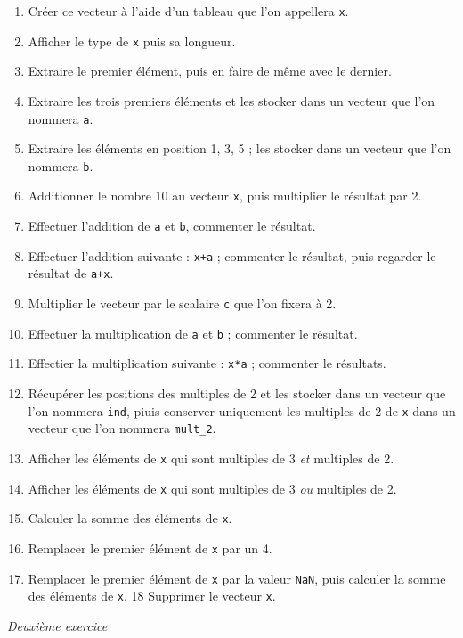 \documentclass[12pt,]{book}
\providecommand{\tightlist}{%
  \setlength{\itemsep}{0pt}\setlength{\parskip}{0pt}}
\numberwithin{equation}{section}
\numberwithin{countremarque}{section}
\begin{document}
\begin{enumerate}
\def\labelenumi{\arabic{enumi}.}
\tightlist
\item
  Créer ce vecteur à l'aide d'un tableau que l'on appellera \texttt{x}.
\item
  Afficher le type de \texttt{x} puis sa longueur.
\item
  Extraire le premier élément, puis en faire de même avec le dernier.
\item
  Extraire les trois premiers éléments et les stocker dans un vecteur
  que l'on nommera \texttt{a}.
\item
  Extraire les éléments en position 1, 3, 5 ; les stocker dans un
  vecteur que l'on nommera \texttt{b}.
\item
  Additionner le nombre 10 au vecteur \texttt{x}, puis multiplier le
  résultat par 2.
\item
  Effectuer l'addition de \texttt{a} et \texttt{b}, commenter le
  résultat.
\item
  Effectuer l'addition suivante : \texttt{x+a} ; commenter le résultat,
  puis regarder le résultat de \texttt{a+x}.
\item
  Multiplier le vecteur par le scalaire \texttt{c} que l'on fixera à 2.
\item
  Effectuer la multiplication de \texttt{a} et \texttt{b} ; commenter le
  résultat.
\item
  Effectier la multiplication suivante : \texttt{x*a} ; commenter le
  résultats.
\item
  Récupérer les positions des multiples de 2 et les stocker dans un
  vecteur que l'on nommera \texttt{ind}, piuis conserver uniquement les
  multiples de 2 de \texttt{x} dans un vecteur que l'on nommera
  \texttt{mult\_2}.
\item
  Afficher les éléments de \texttt{x} qui sont multiples de 3 \emph{et}
  multiples de 2.
\item
  Afficher les éléments de \texttt{x} qui sont multiples de 3 \emph{ou}
  multiples de 2.
\item
  Calculer la somme des éléments de \texttt{x}.
\item
  Remplacer le premier élément de \texttt{x} par un 4.
\item
  Remplacer le premier élément de \texttt{x} par la valeur \texttt{NaN},
  puis calculer la somme des éléments de \texttt{x}. 18 Supprimer le
  vecteur \texttt{x}.
\end{enumerate}

\emph{Deuxième exercice}
\end{document}
